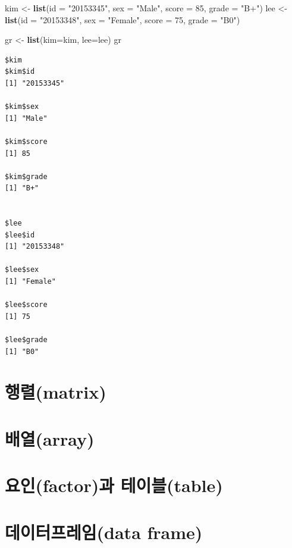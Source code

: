 \documentclass[
  11pt,
]{krantz}
\newenvironment{Shaded}{\begin{snugshade}}{\end{snugshade}}
\newcommand{\DataTypeTok}[1]{\textcolor[rgb]{0.27,0.27,0.27}{#1}}
\newcommand{\DecValTok}[1]{\textcolor[rgb]{0.06,0.06,0.06}{#1}}
\newcommand{\KeywordTok}[1]{\textcolor[rgb]{0.27,0.27,0.27}{\textbf{#1}}}
\newcommand{\NormalTok}[1]{#1}
\newcommand{\StringTok}[1]{\textcolor[rgb]{0.5,0.5,0.5}{#1}}
\begin{document}
\begin{Shaded}
\begin{Highlighting}[]
\NormalTok{kim <-}\StringTok{ }\KeywordTok{list}\NormalTok{(}\DataTypeTok{id =} \StringTok{"20153345"}\NormalTok{, }\DataTypeTok{sex =} \StringTok{"Male"}\NormalTok{, }\DataTypeTok{score =} \DecValTok{85}\NormalTok{, }\DataTypeTok{grade =} \StringTok{"B+"}\NormalTok{)}
\NormalTok{lee <-}\StringTok{ }\KeywordTok{list}\NormalTok{(}\DataTypeTok{id =} \StringTok{"20153348"}\NormalTok{, }\DataTypeTok{sex =} \StringTok{"Female"}\NormalTok{, }\DataTypeTok{score =} \DecValTok{75}\NormalTok{, }\DataTypeTok{grade =} \StringTok{"B0"}\NormalTok{)}

\NormalTok{gr <-}\StringTok{ }\KeywordTok{list}\NormalTok{(}\DataTypeTok{kim=}\NormalTok{kim, }\DataTypeTok{lee=}\NormalTok{lee)}
\NormalTok{gr}
\end{Highlighting}
\end{Shaded}

\begin{verbatim}
$kim
$kim$id
[1] "20153345"

$kim$sex
[1] "Male"

$kim$score
[1] 85

$kim$grade
[1] "B+"


$lee
$lee$id
[1] "20153348"

$lee$sex
[1] "Female"

$lee$score
[1] 75

$lee$grade
[1] "B0"
\end{verbatim}

\normalsize

\hypertarget{matrix}{%
\section{행렬(matrix)}\label{matrix}}

\hypertarget{array}{%
\section{배열(array)}\label{array}}

\hypertarget{factor-table}{%
\section{요인(factor)과 테이블(table)}\label{factor-table}}

\hypertarget{data-frame}{%
\section{데이터프레임(data frame)}\label{data-frame}}

  

\printindex
\end{document}
